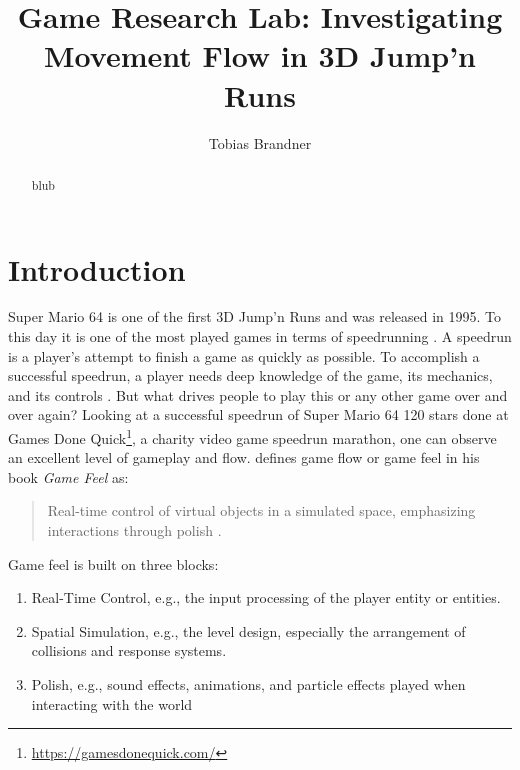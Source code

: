 \documentclass[letterpaper, 10 pt, conference]{ieeeconf}  %
\title{\LARGE \bf
Game Research Lab: Investigating Movement Flow in 3D Jump'n Runs
}
\author{Tobias Brandner}
\affil{Julius-Maximilians University \\
        Würzburg, Germany \\
        tobias.brandner@stud-mail.uni-wuerzburg.de}
\begin{document}
\maketitle
\thispagestyle{empty}
\pagestyle{empty}

\BiblatexSplitbibDefernumbersWarningOff

\begin{abstract}

blub

\end{abstract}


\section{Introduction}

Super Mario 64 \cite{SuperMario64} is one of the first 3D Jump'n Runs and was released in 1995.
To this day it is one of the most played games in terms of speedrunning \cite{SpeedrunDotCom}.
A speedrun is a player's attempt to finish a game as quickly as possible.
To accomplish a successful speedrun, a player needs deep knowledge of the game, its mechanics, and its controls \cite{speedrun}.
But what drives people to play this or any other game over and over again? 
Looking at a successful speedrun of Super Mario 64 120 stars \cite{Sm64Speed} done at Games Done Quick\footnote{\url{https://gamesdonequick.com/}}, a charity video game speedrun marathon, one can observe an excellent level of gameplay and flow. 
\citeauthor{swink2008game} defines game flow or game feel in his book \textit{Game Feel} as:

\begin{quote}
    Real-time control of virtual objects in a simulated space, emphasizing interactions through polish \cite{swink2008game}.
\end{quote}

Game feel is built on three blocks:

\begin{enumerate}
    \item Real-Time Control, e.g., the input processing of the player entity or entities.
    \item Spatial Simulation, e.g., the level design, especially the arrangement of collisions and response systems.
    \item Polish, e.g., sound effects, animations, and particle effects played when interacting with the world
\end{enumerate}
\end{document}
